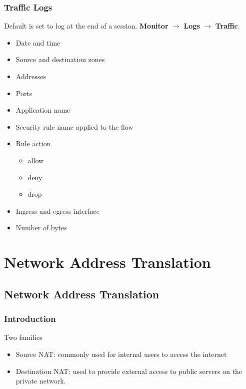 \subsubsection{Traffic Logs}
Default is set to log at the end of a session. \textbf{Monitor} $\rightarrow$ \textbf{Logs} $\rightarrow$ \textbf{Traffic}.
    \begin{itemize}
        \item Date and time
        \item Source and destination zones
        \item Addresses
        \item Ports
        \item Application name
        \item Security rule name applied to the flow
        \item Rule action
            \begin{itemize}
                \item allow
                \item deny
                \item drop
            \end{itemize}
        \item Ingress and egress interface
        \item Number of bytes
    \end{itemize}    

\section{Network Address Translation}
\subsection{Network Address Translation}
\subsubsection{Introduction}
Two families
    \begin{itemize}
        \item Source NAT:  commonly used for internal users to access the internet
        \item Destination NAT: used to provide external access to public servers on the private network.
    \end{itemize}

